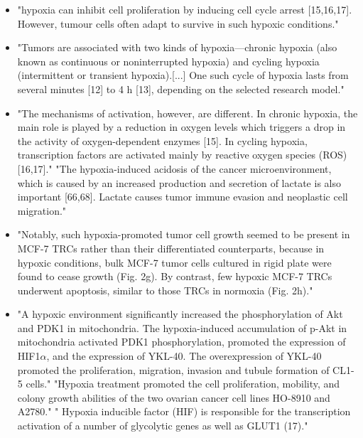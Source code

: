 \documentclass[11pt,a4paper]{article}
\begin{document}
\begin{itemize}
\item "hypoxia can inhibit cell proliferation by inducing cell cycle arrest [15,16,17]. However, tumour cells often adapt to survive in such hypoxic conditions." \cite{Druker2021}
\item "Tumors are associated with two kinds of hypoxia—chronic hypoxia (also known as continuous or noninterrupted hypoxia) and cycling hypoxia (intermittent or transient hypoxia).[...]  One such cycle of hypoxia lasts from several minutes [12] to 4 h [13], depending on the selected research model."\cite{Korbecki2021}
\item "The mechanisms of activation, however, are different. In chronic hypoxia, the main role is played by a reduction in oxygen levels which triggers a drop in the activity of oxygen-dependent enzymes [15]. In cycling hypoxia, transcription factors are activated mainly by reactive oxygen species (ROS) [16,17]."\cite{Korbecki2021}
"The hypoxia-induced acidosis of the cancer microenvironment, which is caused by an increased production and secretion of lactate is also important [66,68]. Lactate causes tumor immune evasion and neoplastic cell migration."\cite{Korbeck2021}
\item "Notably, such hypoxia-promoted tumor cell growth seemed to be present in MCF-7 TRCs rather than their differentiated counterparts, because in hypoxic conditions, bulk MCF-7 tumor cells cultured in rigid plate were found to cease growth (Fig. 2g). By contrast, few hypoxic MCF-7 TRCs underwent apoptosis, similar to those TRCs in normoxia (Fig. 2h)." \cite{Tang2019}
\item "A hypoxic environment significantly increased the phosphorylation of Akt and PDK1 in mitochondria. The hypoxia-induced accumulation of p-Akt in mitochondria activated PDK1 phosphorylation, promoted the expression of HIF1$\alpha$, and the expression of YKL-40. The overexpression of YKL-40 promoted the proliferation, migration, invasion and tubule formation of CL1-5 cells." \cite{Miao2020}
"Hypoxia treatment promoted the cell proliferation, mobility, and colony growth abilities of the two ovarian cancer cell lines HO-8910 and A2780."\cite{Li2023}
" Hypoxia inducible factor (HIF) is responsible for the transcription activation of a number of glycolytic genes as well as GLUT1 (17)."\cite{Jozwiak2014}
\end{itemize}
\end{document}
